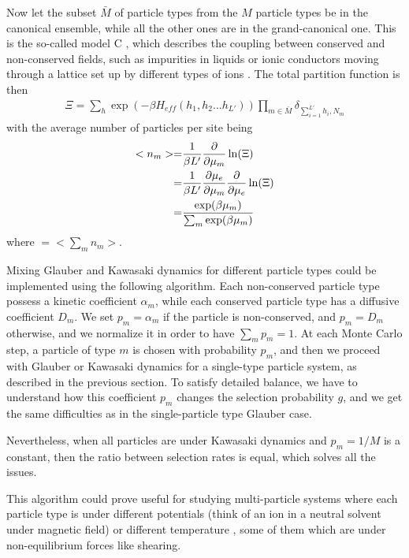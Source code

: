 Now let the subset $\bar{M}$ of particle types from the $M$ particle types be in the canonical ensemble, while all the other ones are in the grand-canonical one. This is the so-called model C \cite{hohenberg_theory_1977}, which describes the coupling between conserved and non-conserved fields, such as impurities in liquids \cite{crisanti_dynamics_1992} or ionic conductors moving through a lattice set up by different types of ions \cite{dieterich_theoretical_1980,katz_nonequilibrium_1984}.
The total partition function is then
\begin{align}
\Xi = \sum_h \exp \left( -\beta H_{eff}(h_1,h_2...h_{L'}) \right) \prod_{m \in \bar{M}} \delta_{\sum_{i=1}^{L'} h_i,N_m}
\end{align}
with the average number of particles per site being
\begin{align}
< n_m > =& \frac{1}{\beta L'} \frac{\partial}{\partial \mu_m} \ln(\Xi) \nonumber \\
=& \frac{1}{\beta L'} \frac{\partial \mu_e}{\partial \mu_m} \frac{\partial}{\partial \mu_e} \ln(\Xi) \nonumber \\
=& \frac{\exp(\beta \mu_m)}{\sum_m \exp(\beta \mu_m)} 
\end{align}
where $ = <\sum_m n_m>$. 


Mixing Glauber and Kawasaki dynamics for different particle types could be implemented using the following algorithm. Each non-conserved particle type possess a kinetic coefficient $\alpha_m$, while each conserved particle type has a diffusive coefficient $D_m$. We set $p_m = \alpha_m$ if the particle is non-conserved, and $p_m = D_m$ otherwise, and we normalize it in order to have $\sum_m p_m = 1$. At each Monte Carlo step, a particle of type $m$ is chosen with probability $p_m$, and then we proceed with Glauber or Kawasaki dynamics for a single-type particle system, as described in the previous section.
To satisfy detailed balance, we have to understand how this coefficient $p_m$ changes the selection probability $g$, and we get the same difficulties as in the single-particle type Glauber case.

Nevertheless, when all particles are under Kawasaki dynamics and $p_m = 1/M$ is a constant, then the ratio between selection rates is equal, which solves all the issues. 

This algorithm could prove useful for studying multi-particle systems where each particle type is under different potentials (think of an ion in a neutral solvent under magnetic field) or different temperature \cite{grosberg_nonequilibrium_2015}, some of them which are under non-equilibrium forces like shearing.


